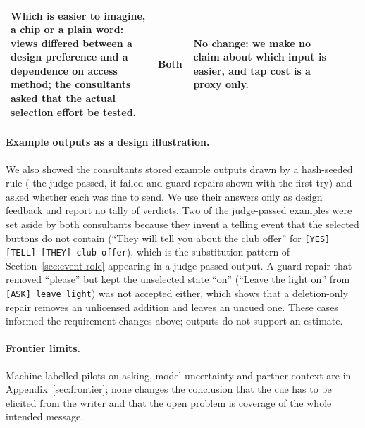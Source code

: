 \begin{table}[t]
\begin{tabular}{@{}p{0.43\linewidth}p{0.07\linewidth}p{0.42\linewidth}@{}}
Which is easier to imagine, a chip or a plain word: views differed between a design preference and a dependence on access method; the consultants asked that the actual selection effort be tested. & Both & No change: we make no claim about which input is easier, and tap cost is a proxy only. \\
\bottomrule
\end{tabular}
\end{table}

\paragraph{Example outputs as a design illustration.}
We also showed the consultants \jmconsExN{} stored example outputs drawn by a hash-seeded rule (\jmconsGoodN{} the judge passed, \jmconsBadN{} it failed and \jmconsRepN{} guard repairs shown with the first try) and asked whether each was fine to send. We use their answers only as design feedback and report no tally of verdicts. Two of the judge-passed examples were set aside by both consultants because they invent a telling event that the selected buttons do not contain (``They will tell you about the club offer'' for \texttt{[YES] [TELL] [THEY] club offer}), which is the substitution pattern of Section~\ref{sec:event-role} appearing in a judge-passed output. A guard repair that removed ``please'' but kept the unselected state ``on'' (``Leave the light on'' from \texttt{[ASK] leave light}) was not accepted either, which shows that a deletion-only repair removes an unlicensed addition and leaves an uncued one. These cases informed the requirement changes above; \jmconsExN{} outputs do not support an estimate.

\paragraph{Frontier limits.} Machine-labelled pilots on asking, model uncertainty and partner context are in Appendix~\ref{sec:frontier}; none changes the conclusion that the cue has to be elicited from the writer and that the open problem is coverage of the whole intended message.
